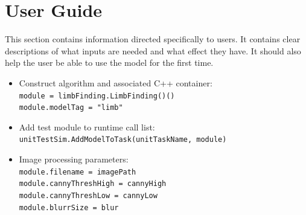 
\section{User Guide}
This section contains information directed specifically to users. It contains clear descriptions of what inputs are needed and what effect they have. It should also help the user be able to use the model for the first time.

\begin{itemize}
\item Construct algorithm and associated C++ container:\\
\texttt{module = limbFinding.LimbFinding()()}\\
\texttt{module.modelTag = "limb"}\\
\item Add test module to runtime call list: \\
\texttt{unitTestSim.AddModelToTask(unitTaskName, module)}\\
\item Image processing parameters: \\
\texttt{module.filename = imagePath}\\
\texttt{module.cannyThreshHigh = cannyHigh}\\
\texttt{module.cannyThreshLow = cannyLow}\\
\texttt{module.blurrSize = blur}\\
\end{itemize}
